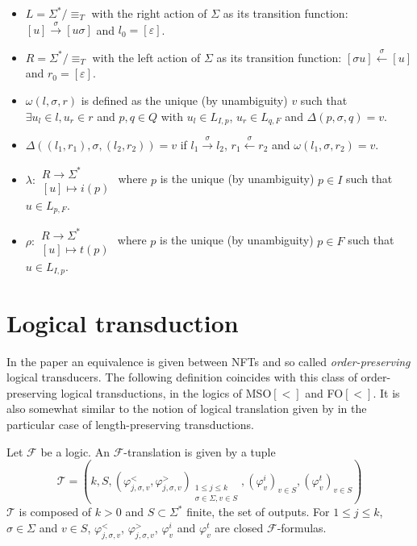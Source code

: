 \documentclass[12pt]{report}
\theoremstyle{definition}
\theoremstyle{remark}
\begin{document}
\begin{itemize}
\item $L=\Sigma^\ast / \equiv_T$ with the right action of $\Sigma$ as its transition function: $[u]\xrightarrow \sigma [u\sigma]$ and $l_0=[\varepsilon]$.
\item $R=\Sigma^\ast / \equiv_T$ with the left action of $\Sigma$ as its transition function: $[\sigma u]\xleftarrow \sigma [u]$ and $r_0=[\varepsilon]$.
\item $\omega(l,\sigma,r)$ is defined as the unique (by unambiguity) $v$ such that
$\exists u_l\in l, u_r\in r$ and $p,q\in Q$ with $u_l\in L_{I,p}$, $u_r\in L_{q,F}$ and $\Delta(p,\sigma,q)=v$.
\item $\Delta((l_1,r_1),\sigma,(l_2,r_2))=v$ if $l_1\xrightarrow{\sigma}l_2$, $r_1\xleftarrow{\sigma}r_2$ and $\omega(l_1,\sigma,r_2)=v$.
\item $\lambda: \begin{array}{c} R\rightarrow \Sigma^\ast \\ \left[ u\right] \mapsto i(p) \end{array}$ where $p$ is the unique (by unambiguity) $p\in I$ such that $u\in L_{p,F}$.
\item $\rho: \begin{array}{c} R\rightarrow \Sigma^\ast \\ \left[ u\right] \mapsto t(p) \end{array}$ where $p$ is the unique (by unambiguity) $p\in F$ such that $u\in L_{I,p}$.

\end{itemize}


\section{Logical transduction}


In the paper \cite{filiot15} an equivalence is given between NFTs and so called \emph{order-preserving} logical transducers.
The following definition coincides with this class of order-preserving logical transductions, in the logics of MSO$[<]$ and FO$[<]$.
It is also somewhat similar to the notion of logical translation given by \cite{mckenzieSTV06} in the particular case of length-preserving transductions.

Let $\mathcal F$ be a logic.
An $\mathcal F$-translation is given by a tuple
$$\mathcal T=\left(k,S,\left(\varphi_{j,\sigma,v}^<,\varphi_{j,\sigma,v}^>\right)_{\begin{smallmatrix} 1\leq j\leq k\\ \sigma \in \Sigma, v\in S \end{smallmatrix}},\left(\varphi_v^i\right)_{v\in S},\left(\varphi_v^t\right)_{v\in S}\right)$$
$\mathcal T$ is composed of $k>0$ and $S\subset \Sigma^\ast$ finite, the set of outputs. For $1\leq j\leq k$, $\sigma\in\Sigma$ and $v\in S$, $\varphi_{j,\sigma,v}^<$, $\varphi_{j,\sigma,v}^>$, $\varphi_v^i$ and $\varphi_v^t$ are closed $\mathcal F$-formulas.
\end{document}
